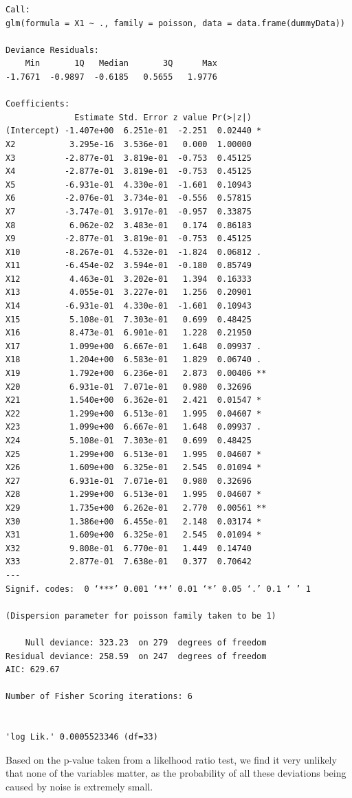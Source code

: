 \documentclass[11pt]{article}
\begin{document}
\begin{verbatim}
Call:
glm(formula = X1 ~ ., family = poisson, data = data.frame(dummyData))

Deviance Residuals: 
    Min       1Q   Median       3Q      Max  
-1.7671  -0.9897  -0.6185   0.5655   1.9776  

Coefficients:
              Estimate Std. Error z value Pr(>|z|)   
(Intercept) -1.407e+00  6.251e-01  -2.251  0.02440 * 
X2           3.295e-16  3.536e-01   0.000  1.00000   
X3          -2.877e-01  3.819e-01  -0.753  0.45125   
X4          -2.877e-01  3.819e-01  -0.753  0.45125   
X5          -6.931e-01  4.330e-01  -1.601  0.10943   
X6          -2.076e-01  3.734e-01  -0.556  0.57815   
X7          -3.747e-01  3.917e-01  -0.957  0.33875   
X8           6.062e-02  3.483e-01   0.174  0.86183   
X9          -2.877e-01  3.819e-01  -0.753  0.45125   
X10         -8.267e-01  4.532e-01  -1.824  0.06812 . 
X11         -6.454e-02  3.594e-01  -0.180  0.85749   
X12          4.463e-01  3.202e-01   1.394  0.16333   
X13          4.055e-01  3.227e-01   1.256  0.20901   
X14         -6.931e-01  4.330e-01  -1.601  0.10943   
X15          5.108e-01  7.303e-01   0.699  0.48425   
X16          8.473e-01  6.901e-01   1.228  0.21950   
X17          1.099e+00  6.667e-01   1.648  0.09937 . 
X18          1.204e+00  6.583e-01   1.829  0.06740 . 
X19          1.792e+00  6.236e-01   2.873  0.00406 **
X20          6.931e-01  7.071e-01   0.980  0.32696   
X21          1.540e+00  6.362e-01   2.421  0.01547 * 
X22          1.299e+00  6.513e-01   1.995  0.04607 * 
X23          1.099e+00  6.667e-01   1.648  0.09937 . 
X24          5.108e-01  7.303e-01   0.699  0.48425   
X25          1.299e+00  6.513e-01   1.995  0.04607 * 
X26          1.609e+00  6.325e-01   2.545  0.01094 * 
X27          6.931e-01  7.071e-01   0.980  0.32696   
X28          1.299e+00  6.513e-01   1.995  0.04607 * 
X29          1.735e+00  6.262e-01   2.770  0.00561 **
X30          1.386e+00  6.455e-01   2.148  0.03174 * 
X31          1.609e+00  6.325e-01   2.545  0.01094 * 
X32          9.808e-01  6.770e-01   1.449  0.14740   
X33          2.877e-01  7.638e-01   0.377  0.70642   
---
Signif. codes:  0 ‘***’ 0.001 ‘**’ 0.01 ‘*’ 0.05 ‘.’ 0.1 ‘ ’ 1

(Dispersion parameter for poisson family taken to be 1)

    Null deviance: 323.23  on 279  degrees of freedom
Residual deviance: 258.59  on 247  degrees of freedom
AIC: 629.67

Number of Fisher Scoring iterations: 6


'log Lik.' 0.0005523346 (df=33)
\end{verbatim}

Based on the p-value taken from a likelhood ratio test, we find it
very unlikely that none of the variables matter, as the probability of
all these deviations being caused by noise is extremely small. 
\end{document}

